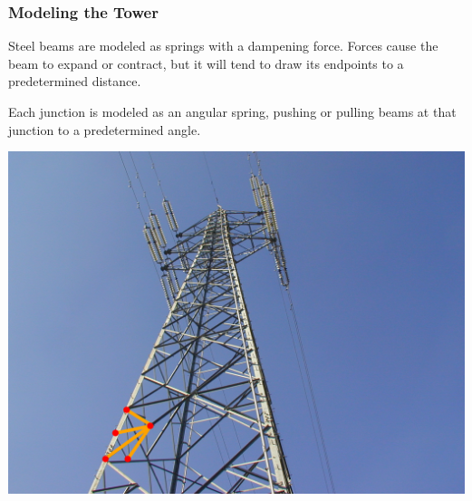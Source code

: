 \documentclass[xcolor=dvipsnames]{beamer}
\begin{document}
\begin{frame}
\frametitle{Modeling the Tower}

Steel beams are modeled as springs with a dampening force.  Forces cause the beam to expand or contract, but it will tend to draw its endpoints to a predetermined distance.

Each junction is modeled as an angular spring, pushing or pulling beams at that junction to a predetermined angle.

\end{frame}

\begin{frame}
\begin{center}
\includegraphics[scale = 0.15]{Steel_tower_model.png}
\end{center}
\end{frame}
\end{document}
